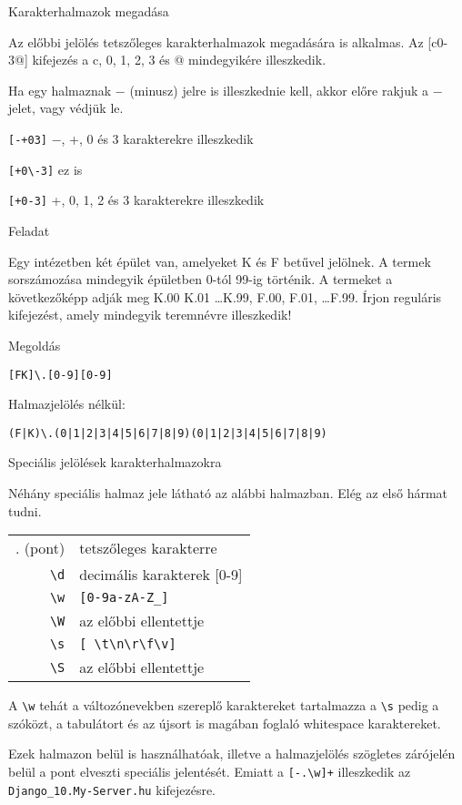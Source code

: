 \documentclass[
    ignorenonframetext
    ]{beamer}
\begin{document}
\begin{frame}[fragile]
    {Karakterhalmazok megadása}

    Az előbbi jelölés tetszőleges karakterhalmazok megadására is alkalmas.
    Az [c0-3@] kifejezés a c, 0, 1, 2, 3 és @ mindegyikére illeszkedik.

    Ha egy halmaznak $-$ (minusz) jelre is illeszkednie kell, akkor
    előre rakjuk a $-$ jelet, vagy védjük le.

    \verb![-+03]! \qquad $-$, +, 0 és 3 karakterekre illeszkedik

    \verb![+0\-3]! \qquad ez is

    \verb![+0-3]! \qquad +, 0, 1, 2 és 3 karakterekre illeszkedik
\end{frame}

\begin{frame}[fragile]
    {Feladat}

    Egy intézetben két épület van, amelyeket K és F betűvel jelölnek. A
    termek sorszámozása mindegyik épületben 0-tól 99-ig történik. A
    termeket a következőképp adják meg K.00 K.01 \ldots K.99, F.00,
    F.01, \ldots F.99. Írjon reguláris kifejezést, amely mindegyik
    teremnévre illeszkedik!

    \megoldasjon
\end{frame}

\begin{frame}[fragile]
    {Megoldás}

    \verb![FK]\.[0-9][0-9]!

    Halmazjelölés nélkül:

    \verb!(F|K)\.(0|1|2|3|4|5|6|7|8|9)(0|1|2|3|4|5|6|7|8|9)!
\end{frame}

\begin{frame}[fragile]
    {Speciális jelölések karakterhalmazokra}

    Néhány speciális halmaz jele látható az alábbi halmazban. Elég az
    első hármat tudni.

    \vfill
    \begin{tabular}{rl}
        . (pont)  & tetszőleges karakterre\\
        \verb"\d" & decimális karakterek [0-9]\\
        \verb"\w" & \verb"[0-9a-zA-Z_]"\\
        \verb"\W" & az előbbi ellentettje\\
        \verb"\s" & \verb"[ \t\n\r\f\v]"\\
        \verb"\S" & az előbbi ellentettje\\
    \end{tabular}

    \vfill
    A \verb"\w" tehát a változónevekben szereplő karaktereket
    tartalmazza a \verb"\s" pedig a szóközt, a tabulátort és az újsort
    is magában foglaló whitespace karaktereket.

    \vfill
    Ezek halmazon belül is használhatóak, illetve a halmazjelölés
    szögletes zárójelén belül a pont elveszti speciális jelentését.
    Emiatt a \verb"[-.\w]+" illeszkedik az
    \verb"Django_10.My-Server.hu" kifejezésre.
\end{frame}
\end{document}
